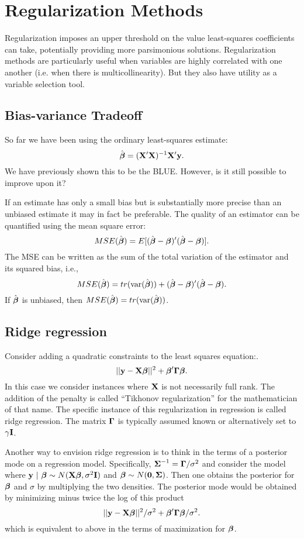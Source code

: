 \section{Regularization Methods}

Regularization imposes an upper threshold on the value least-squares coefficients can take,  potentially providing more parsimonious solutions. 
Regularization methods are particularly useful when variables are highly correlated with one another (i.e. when there is multicollinearity).
But they also have utility as a variable selection tool.


\subsection{Bias-variance Tradeoff}

So far we have been using the ordinary least-squares estimate:
$$
\hat {\mbox{\boldmath $\beta$}} = (\mathbf{X}' \mathbf{X})^{-1} \mathbf{X}' \mathbf{y}.
$$
We have previously shown this to be the BLUE.
However, is it still possible to improve upon it?

If an estimate has only a small bias but is substantially more precise than an unbiased estimate it may in fact be preferable.
The quality of an estimator can be quantified using the mean square error: 
$$
MSE(\hat {\mbox{\boldmath $\beta$}}) = E[({\hat {\mbox{\boldmath $\beta$}}} - \mbox{\boldmath $\beta$})'({\hat {\mbox{\boldmath $\beta$}}} - \mbox{\boldmath $\beta$})].
$$
The MSE can be written as the sum of the total variation of the estimator and its squared bias, i.e.,
$$
MSE(\hat {\mbox{\boldmath $\beta$}}) = tr(\mathrm{var}({\hat {\mbox{\boldmath $\beta$}}})) + ({\hat {\mbox{\boldmath $\beta$}}} - \mbox{\boldmath $\beta$})'({\hat {\mbox{\boldmath $\beta$}}} - \mbox{\boldmath $\beta$}).
$$
If $\hat {\mbox{\boldmath $\beta$}}$ is unbiased, then $MSE(\hat {\mbox{\boldmath $\beta$}}) = tr(\mathrm{var}({\hat {\mbox{\boldmath $\beta$}}}))$. 


\subsection{Ridge regression}

Consider adding a quadratic constraints to the least squares equation:.
$$
||\mathbf{y} - \mathbf{X} \boldsymbol{\beta}||^2 + \boldsymbol{\beta}' \boldsymbol{\Gamma} \boldsymbol{\beta}.
$$
In this case we consider instances where $\mathbf{X}$ is not necessarily full rank. The
addition of the penalty is called ``Tikhonov regularization'' for the mathematician of
that name. The specific instance of this regularization in regression is called ridge
regression. The matrix $\boldsymbol{\Gamma}$ is typically assumed known or alternatively set to $\gamma \mathbf{I}$. 

Another way to envision ridge regression is to think in the terms of a posterior mode 
on a regression model. Specifically, $\boldsymbol{\Sigma}^{-1} = \boldsymbol{\Gamma} / \sigma^2$ and consider the model
where $\mathbf{y} ~|~ \boldsymbol{\beta} \sim N(\mathbf{X} \boldsymbol{\beta}, \sigma^2 \mathbf{I})$ and $\boldsymbol{\beta} \sim N(\mathbf{0}, \boldsymbol{\Sigma})$. 
Then one obtains the posterior for $\boldsymbol{\beta}$ and $\sigma$ by multiplying the two densities. The
posterior mode would be obtained by minimizing minus twice the log of this product
$$
||\mathbf{y} - \mathbf{X} \boldsymbol{\beta}||^2 / \sigma^2 + \boldsymbol{\beta}' \boldsymbol{\Gamma} \boldsymbol{\beta} / \sigma^2.
$$
which is equivalent to above in the terms of maximization for $\boldsymbol{\beta}$.

